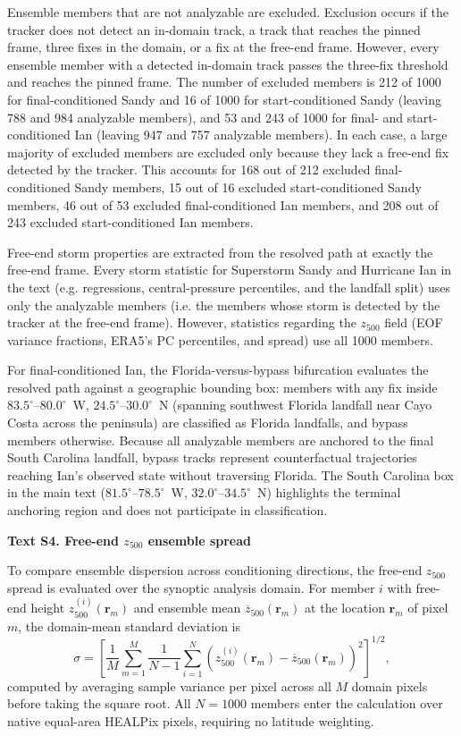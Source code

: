 Ensemble members that are not analyzable are excluded. Exclusion occurs if the tracker does not detect an in-domain track, a track that reaches the pinned frame, three fixes in the domain, or a fix at the free-end frame. However, every ensemble member with a detected in-domain track passes the three-fix threshold and reaches the pinned frame. The number of excluded members is 212 of 1000 for final-conditioned Sandy and 16 of 1000 for start-conditioned Sandy (leaving 788 and 984 analyzable members), and 53 and 243 of 1000 for final- and start-conditioned Ian (leaving 947 and 757 analyzable members). In each case, a large majority of excluded members are excluded only because they lack a free-end fix detected by the tracker. This accounts for 168 out of 212 excluded final-conditioned Sandy members, 15 out of 16 excluded start-conditioned Sandy members, 46 out of 53 excluded final-conditioned Ian members, and 208 out of 243 excluded start-conditioned Ian members.

Free-end storm properties are extracted from the resolved path at exactly the free-end frame. Every storm statistic for Superstorm Sandy and Hurricane Ian in the text (e.g. regressions, central-pressure percentiles, and the landfall split) uses only the analyzable members (i.e. the members whose storm is detected by the tracker at the free-end frame). However, statistics regarding the $z_{500}$ field (EOF variance fractions, ERA5's PC percentiles, and spread) use all 1000 members.

For final-conditioned Ian, the Florida-versus-bypass bifurcation evaluates the resolved path against a geographic bounding box: members with any fix inside $83.5^{\circ}$--$80.0^{\circ}$~W, $24.5^{\circ}$--$30.0^{\circ}$~N (spanning southwest Florida landfall near Cayo Costa across the peninsula) are classified as Florida landfalls, and bypass members otherwise. Because all analyzable members are anchored to the final South Carolina landfall, bypass tracks represent counterfactual trajectories reaching Ian's observed state without traversing Florida. The South Carolina box in the main text ($81.5^{\circ}$--$78.5^{\circ}$~W, $32.0^{\circ}$--$34.5^{\circ}$~N) highlights the terminal anchoring region and does not participate in classification.

\noindent\textbf{Text S4. Free-end $z_{500}$ ensemble spread}

To compare ensemble dispersion across conditioning directions, the free-end $z_{500}$ spread is evaluated over the synoptic analysis domain. For member $i$ with free-end height $z_{500}^{(i)}(\mathbf{r}_{m})$ and ensemble mean $\overline{z}_{500}(\mathbf{r}_{m})$ at the location $\mathbf{r}_{m}$ of pixel $m$, the domain-mean standard deviation is
\begin{equation}
\sigma = \left[ \frac{1}{M} \sum_{m=1}^{M} \frac{1}{N-1} \sum_{i=1}^{N} \left( z_{500}^{(i)}(\mathbf{r}_{m}) - \overline{z}_{500}(\mathbf{r}_{m}) \right)^{2} \right]^{1/2} ,
\end{equation}
computed by averaging sample variance per pixel across all $M$ domain pixels before taking the square root. All $N = 1000$ members enter the calculation over native equal-area HEALPix pixels, requiring no latitude weighting.

